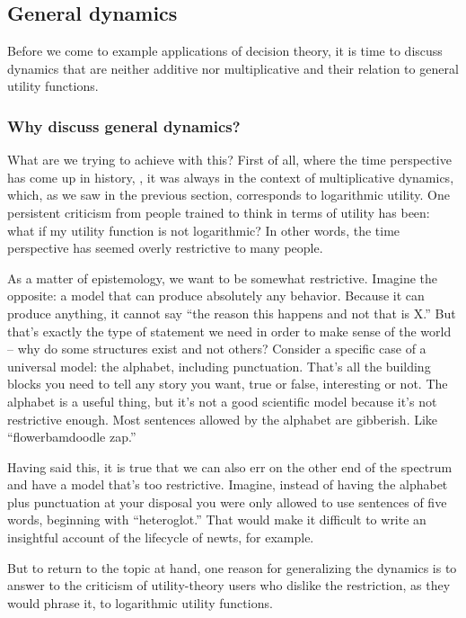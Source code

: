 \subsection{General dynamics}
Before we come to example applications of decision theory, it is time to discuss 
dynamics that are neither additive nor multiplicative and their relation to general
utility functions. 

\subsubsection{Why discuss general dynamics?}
What are we trying to achieve with this? First of all, where the time perspective has come
up in history, \eg \cite{Whitworth1870,Kelly1956}, it was always in the context of multiplicative 
dynamics, which, as we saw in the previous section, corresponds to logarithmic utility. One 
persistent criticism from people trained to think in terms of utility has been: what if my utility 
function is not logarithmic? In other words, the time perspective has seemed overly restrictive 
to many people.

As a matter of epistemology, we want to be somewhat restrictive. Imagine the opposite: a 
model that can produce absolutely any behavior. Because it can produce anything, it cannot 
say ``the reason this happens and not that is X.'' But that's exactly the type of statement we 
need in order to make sense of the world -- why do some structures exist and not others? 
Consider a specific case of a universal model: the alphabet, including punctuation. That's all 
the building blocks you need to tell any story you want, true or false, interesting or not. The 
alphabet is a useful thing, but it's not a good scientific model because it's not restrictive 
enough. Most sentences allowed by the alphabet are gibberish. Like ``flowerbamdoodle 
zap.''

Having said this, it is true that we can also err on the other end of the spectrum and have a 
model that's too restrictive. Imagine, instead of having the alphabet plus punctuation at your 
disposal you were only allowed to use sentences of five words, 
beginning with ``heteroglot.'' That would make it difficult to write an insightful account of the 
lifecycle of newts, for example.

But to return to the topic at hand, one reason for generalizing the dynamics is to answer to 
the criticism of utility-theory users who dislike the restriction, as they would phrase it, to logarithmic utility functions.

